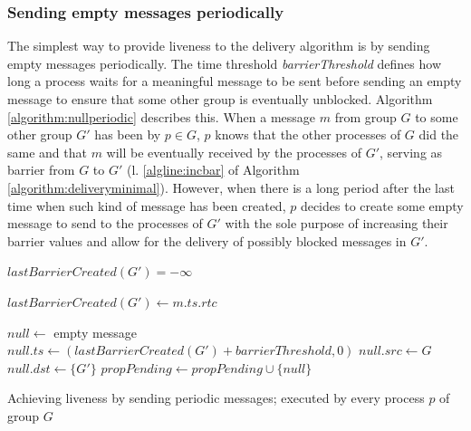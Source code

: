 \documentclass[times, 10pt]{article}
\begin{document}
\subsubsection{Sending empty messages periodically}
\label{sec:nullperiodic}

The simplest way to provide liveness to the delivery algorithm is by sending empty messages periodically. The time threshold \textit{barrierThreshold} defines how long a process waits for a meaningful message to be sent before sending an empty message to ensure that some other group is eventually unblocked. Algorithm \ref{algorithm:nullperiodic} describes this. When a message $m$ from group $G$ to some other group $G'$ has been \rmc{} by $p \in G$, $p$ knows that the other processes of $G$ did the same and that $m$ will be eventually received by the processes of $G'$, serving as barrier from $G$ to $G'$ (l. \ref{algline:incbar} of Algorithm \ref{algorithm:deliveryminimal}). However, when there is a long period after the last time when such kind of message has been created, $p$ decides to create some empty message to send to the processes of $G'$ with the sole purpose of increasing their barrier values and allow for the delivery of possibly blocked messages in $G'$.

\begin{algorithm}
\begin{distribalgo}[1]
\blankline
{}
    \STATE $lastBarrierCreated(G') = -\infty$
  \ENDINDENT
\ENDINDENT

\blankline
{}
  \STATE $lastBarrierCreated(G') \leftarrow m.ts.rtc$
\ENDINDENT

\blankline
{}
  \STATE $null \leftarrow$ empty message
  \STATE $null.ts \leftarrow (lastBarrierCreated(G') + barrierThreshold, 0)$ \label{algline:samenullid}
  \STATE $null.src \leftarrow G$
  \STATE $null.dst \leftarrow \{G'\}$ 
  \STATE $propPending \leftarrow propPending \cup \{null\}$
\ENDINDENT 

\blankline
\caption{Achieving liveness by sending periodic messages; executed by every process $p$ of group $G$}
\label{algorithm:nullperiodic}
\end{distribalgo} 
\end{algorithm}
\end{document}
